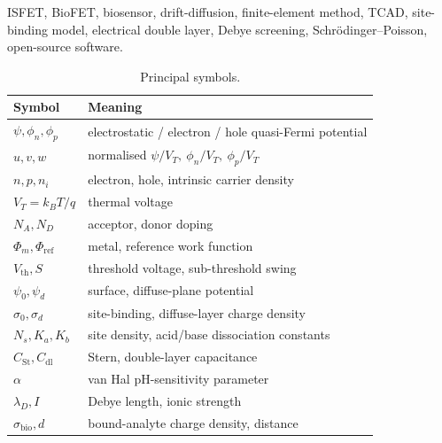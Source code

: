 \documentclass[10pt,journal]{IEEEtran}
\begin{document}
\begin{IEEEkeywords}
ISFET, BioFET, biosensor, drift-diffusion, finite-element method, TCAD,
site-binding model, electrical double layer, Debye screening, Schr\"odinger--Poisson,
open-source software.
\end{IEEEkeywords}

\begin{table}[t]
\centering
\caption{Principal symbols.}
\label{tab:nomen}
\footnotesize
\begin{tabular}{@{}ll@{}}
\toprule
Symbol & Meaning \\
\midrule
$\psi,\phi_n,\phi_p$ & electrostatic / electron / hole quasi-Fermi potential \\
$u,v,w$ & normalised $\psi/V_T,\ \phi_n/V_T,\ \phi_p/V_T$ \\
$n,p,n_i$ & electron, hole, intrinsic carrier density \\
$V_T=k_BT/q$ & thermal voltage \\
$N_A,N_D$ & acceptor, donor doping \\
$\Phi_m,\Phi_{\mathrm{ref}}$ & metal, reference work function \\
$V_{\mathrm{th}},S$ & threshold voltage, sub-threshold swing \\
$\psi_0,\psi_d$ & surface, diffuse-plane potential \\
$\sigma_0,\sigma_d$ & site-binding, diffuse-layer charge density \\
$N_s,K_a,K_b$ & site density, acid/base dissociation constants \\
$C_{\mathrm{St}},C_{\mathrm{dl}}$ & Stern, double-layer capacitance \\
$\alpha$ & van Hal pH-sensitivity parameter \\
$\lambda_D,I$ & Debye length, ionic strength \\
$\sigma_{\mathrm{bio}},d$ & bound-analyte charge density, distance \\
\bottomrule
\end{tabular}
\end{table}

\end{document}
